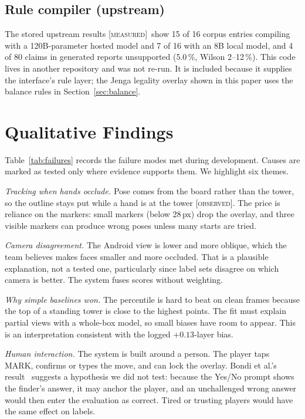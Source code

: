 \documentclass[conference,10pt]{IEEEtran}
\newcommand{\evM}{\textsc{[measured]}}
\newcommand{\evO}{\textsc{[observed]}}
\begin{document}
\subsection{Rule compiler (upstream)}
The stored upstream results \evM\ show 15 of 16 corpus entries compiling with a 120B-parameter hosted model and 7 of 16 with an 8B local model, and 4 of 80 claims in generated reports unsupported (5.0\,\%, Wilson 2--12\,\%). This code lives in another repository and was not re-run. It is included because it supplies the interface's rule layer; the Jenga legality overlay shown in this paper uses the balance rules in Section~\ref{sec:balance}.

\section{Qualitative Findings}\label{sec:qual}
Table~\ref{tab:failures} records the failure modes met during development. Causes are marked as tested only where evidence supports them. We highlight six themes.

\emph{Tracking when hands occlude.} Pose comes from the board rather than the tower, so the outline stays put while a hand is at the tower \evO. The price is reliance on the markers: small markers (below 28\,px) drop the overlay, and three visible markers can produce wrong poses unless many starts are tried.

\emph{Camera disagreement.} The Android view is lower and more oblique, which the team believes makes faces smaller and more occluded. That is a plausible explanation, not a tested one, particularly since label sets disagree on which camera is better. The system fuses scores without weighting.

\emph{Why simple baselines won.} The percentile is hard to beat on clean frames because the top of a standing tower is close to the highest points. The fit must explain partial views with a whole-box model, so small biases have room to appear. This is an interpretation consistent with the logged $+0.13$-layer bias.

\emph{Human interaction.} The system is built around a person. The player taps MARK, confirms or types the move, and can lock the overlay. Bondi et al.'s result~\cite{bondi2022} suggests a hypothesis we did not test: because the Yes/No prompt shows the finder's answer, it may anchor the player, and an unchallenged wrong answer would then enter the evaluation as correct. Tired or trusting players would have the same effect on labels.
\end{document}
